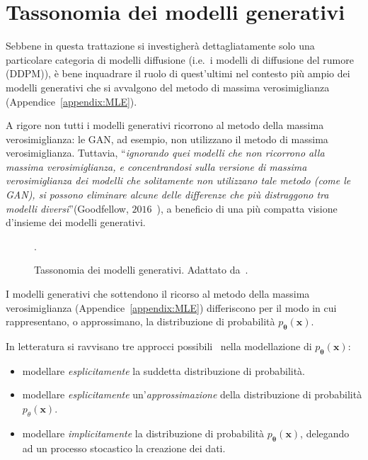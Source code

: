 
\section{Tassonomia dei modelli generativi}

Sebbene in questa trattazione si investigherà dettagliatamente solo una particolare categoria di modelli diffusione (i.e.\ i modelli di diffusione del rumore (DDPM)), 
è bene inquadrare il ruolo di quest'ultimi nel contesto più ampio dei modelli generativi che si avvalgono del metodo di massima verosimiglianza (Appendice~\ref{appendix:MLE}).
\begin{oss}
A rigore non tutti i modelli generativi ricorrono al metodo della massima verosimiglianza: le GAN, ad esempio, non utilizzano il metodo di massima verosimiglianza.
Tuttavia, “\emph{ignorando quei modelli che non ricorrono alla massima verosimiglianza, e concentrandosi sulla 
versione di massima verosimiglianza dei modelli che solitamente non utilizzano tale metodo (come le GAN), 
si possono eliminare alcune delle differenze che più distraggono tra
modelli diversi}”(Goodfellow, $2016$~\cite{goodfellowNIPS2016Tutorial2017}), a beneficio di una più compatta visione d'insieme dei modelli generativi.
\end{oss}
\begin{figure}
  \centering
  
  \caption{Tassonomia dei modelli generativi. Adattato da~\cite{fosterGenerativeDeepLearning2023,goodfellowNIPS2016Tutorial2017}.}.
  \label{fig:gen_models_taxonomy}
\end{figure}
\noindent I modelli generativi che sottendono il ricorso al metodo della massima verosimiglianza (Appendice~\ref{appendix:MLE}) 
differiscono per il modo in cui rappresentano, o approssimano, la distribuzione di probabilità $p_{\bm{\theta}}(\mathbf{x})$\cite{goodfellowNIPS2016Tutorial2017}.

\noindent In letteratura si ravvisano tre approcci possibili~\cite{fosterGenerativeDeepLearning2023} nella modellazione di $p_{\bm{\theta}}(\mathbf{x})$:
\begin{itemize}
\item modellare \emph{esplicitamente} la suddetta distribuzione di probabilità.
\item modellare \emph{esplicitamente} un'\emph{approssimazione} della distribuzione di probabilità $p_\theta(\mathbf{x})$. 
\item modellare \emph{implicitamente} la distribuzione di probabilità $p_{\bm{\theta}}(\mathbf{x})$, delegando ad un processo stocastico la creazione dei dati.
\end{itemize}

